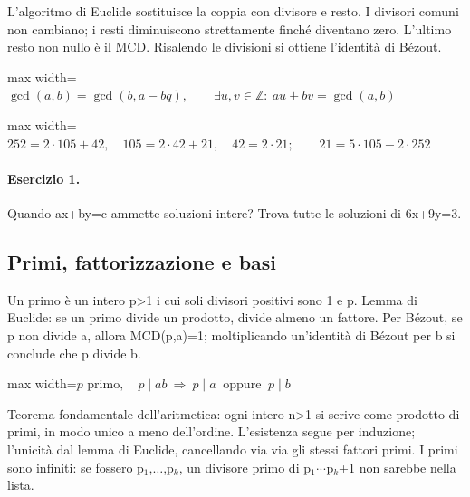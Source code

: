 \documentclass[a4paper,11pt]{article}
\begin{document}
L’algoritmo di Euclide sostituisce la coppia con divisore e resto. I divisori comuni non cambiano; i resti diminuiscono strettamente finché diventano zero. L’ultimo resto non nullo è il MCD. Risalendo le divisioni si ottiene l’identità di Bézout.

\begin{center}\begin{adjustbox}{max width=\linewidth}$\displaystyle \gcd(a,b)=\gcd(b,a-bq),\qquad \exists u,v\in\mathbb Z:\ au+bv=\gcd(a,b)$\end{adjustbox}\end{center}

\begin{center}\begin{adjustbox}{max width=\linewidth}$\displaystyle 252=2\cdot105+42,\quad105=2\cdot42+21,\quad42=2\cdot21;\qquad21=5\cdot105-2\cdot252$\end{adjustbox}\end{center}

\paragraph{Esercizio 1.} Quando ax+by=c ammette soluzioni intere? Trova tutte le soluzioni di 6x+9y=3.

\subsection{Primi, fattorizzazione e basi}

Un primo è un intero p>1 i cui soli divisori positivi sono 1 e p. Lemma di Euclide: se un primo divide un prodotto, divide almeno un fattore. Per Bézout, se p non divide a, allora MCD(p,a)=1; moltiplicando un’identità di Bézout per b si conclude che p divide b.

\begin{center}\begin{adjustbox}{max width=\linewidth}$\displaystyle p\text{ primo},\quad p\mid ab\ \Longrightarrow\ p\mid a\ \text{ oppure }\ p\mid b$\end{adjustbox}\end{center}

Teorema fondamentale dell’aritmetica: ogni intero n>1 si scrive come prodotto di primi, in modo unico a meno dell’ordine. L’esistenza segue per induzione; l’unicità dal lemma di Euclide, cancellando via via gli stessi fattori primi. I primi sono infiniti: se fossero p$_{1}$,$\ldots$,p$_{k}$, un divisore primo di p$_{1}$$\cdot$$\cdot$$\cdot$p$_{k}$+1 non sarebbe nella lista.
\end{document}
